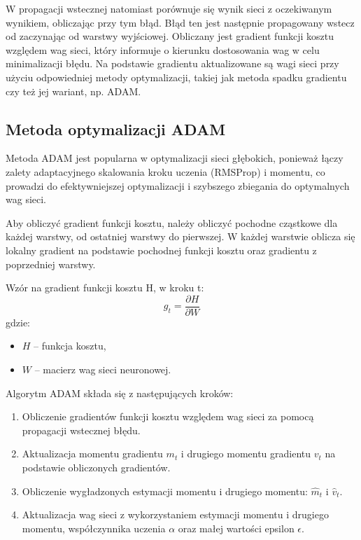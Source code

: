 \documentclass{article}
\begin{document}
W propagacji wstecznej natomiast porównuje się wynik sieci z oczekiwanym wynikiem, obliczając przy tym błąd.
Błąd ten jest następnie propagowany wstecz od zaczynając od warstwy wyjściowej.
Obliczany jest gradient funkcji kosztu względem wag sieci, który informuje o kierunku dostosowania wag w celu minimalizacji błędu.
Na podstawie gradientu aktualizowane są wagi sieci przy użyciu odpowiedniej metody optymalizacji, takiej jak metoda spadku gradientu czy też jej wariant, np. ADAM.

\subsection{Metoda optymalizacji ADAM}
Metoda ADAM jest popularna w optymalizacji sieci głębokich, ponieważ łączy zalety adaptacyjnego skalowania kroku uczenia (RMSProp) i momentu, co prowadzi do efektywniejszej optymalizacji i szybszego zbiegania do optymalnych wag sieci.

Aby obliczyć gradient funkcji kosztu, należy obliczyć pochodne cząstkowe dla każdej warstwy, od ostatniej warstwy do pierwszej.
W każdej warstwie oblicza się lokalny gradient na podstawie pochodnej funkcji kosztu oraz gradientu z poprzedniej warstwy.

Wzór na gradient funkcji kosztu H, w kroku t:
\[ g_t = \frac{\partial H}{\partial W} \]
gdzie:
\begin{itemize}
    \item \( H\) -- funkcja kosztu,
    \item \(W\) -- macierz wag sieci neuronowej.
\end{itemize}

Algorytm ADAM składa się z następujących kroków:
\begin{enumerate}
    \item Obliczenie gradientów funkcji kosztu względem wag sieci za pomocą propagacji wstecznej błędu.
    \item Aktualizacja momentu gradientu \(m_t\) i drugiego momentu gradientu \(v_t\) na podstawie obliczonych gradientów.
    \item Obliczenie wygładzonych estymacji momentu i drugiego momentu: \(\hat{m}_t\) i \(\hat{v}_t\).
    \item Aktualizacja wag sieci z wykorzystaniem estymacji momentu i drugiego momentu, współczynnika uczenia \(\alpha\) oraz małej wartości epsilon \(\epsilon\).
\end{enumerate}
\end{document}
